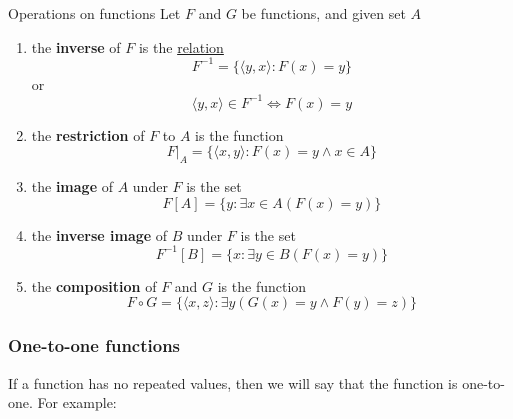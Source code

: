 \begin{definition}{Operations on functions}{}
    Let $F$ and $G$ be functions, and given set $A$
    \begin{enumerate}

        \item the \textbf{inverse} of $F$ is the \underline{relation} 
        \begin{equation*}
            F^{-1} = \{\langle y,x \rangle : F(x) = y\}
        \end{equation*}
        or
        \begin{equation*}
            \langle y,x \rangle \in F^{-1} \iff F(x) = y
        \end{equation*}
        \item the \textbf{restriction} of $F$ to $A$ is the function
        \begin{equation*}
            F \vert_{A} = \{\langle x,y \rangle : F(x) = y \land x \in A\}
        \end{equation*}
        \item the \textbf{image} of $A$ under $F$ is the set
        \begin{equation*}
            F[A] = \{y : \exists x \in A (F(x) = y)\}
        \end{equation*}
        \item the \textbf{inverse image} of $B$ under $F$ is the set
        \begin{equation*}
            F^{-1}[B] = \{x : \exists y \in B(F(x) = y)\}
        \end{equation*}
        \item the \textbf{composition} of $F$ and $G$ is the function
        \begin{equation*}
            F \circ G = \{\langle x,z \rangle : \exists y (G(x)=y \land F(y)=z)\}
        \end{equation*}
    \end{enumerate}
\end{definition}

\subsubsection{One-to-one functions}
If a function has no repeated values, then we will say that the function is one-to-one.
For example:

